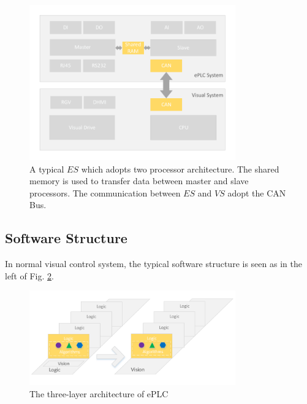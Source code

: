 \documentclass[journal,UTF8]{IEEEtran}
\begin{document}
\begin{figure}
	\centering
	\includegraphics[width=3.5in]{fig/Hardware.pdf}
	\caption{A typical $ES$ which adopts two processor architecture. The shared memory is used to transfer data between master and slave processors. The communication between $ES$ and $VS$ adopt the CAN Bus.}
	\label{fig:Hardware}
\end{figure}
\subsection{Software Structure}
In normal visual control system, the typical software structure is seen as in the left of Fig. \ref{fig:Software}.


\begin{figure}
	\centering
	\includegraphics[width=3.5in]{fig/Software.pdf}
	\caption{The three-layer architecture of ePLC}
	\label{fig:Software}
\end{figure}
\end{document}
